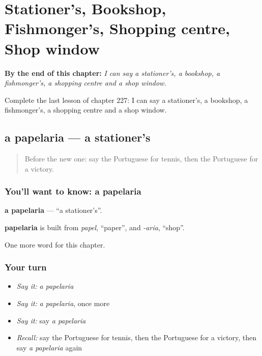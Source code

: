 
\chapter{Stationer's, Bookshop, Fishmonger's, Shopping centre, Shop window}
\label{ch:pt-stationer-s-bookshop-fishmonger-s-shopping-centre-shop-window}

\begin{chapteropening}
\textbf{By the end of this chapter:} \emph{I can say a stationer's, a bookshop, a fishmonger's, a shopping centre and a shop window.}

Complete the last lesson of chapter 227: I can say a stationer's, a bookshop, a fishmonger's, a shopping centre and a shop window.
\end{chapteropening}

\section[a papelaria]{a papelaria — a stationer's}

\label{lesson:PT-C227-papelaria}



\begin{quote}
Before the new one: say the Portuguese for tennis, then the Portuguese for a victory.
\end{quote}

\subsection*{You'll want to know: a papelaria}
\textbf{a papelaria} — \textquotedblleft{}a stationer's\textquotedblright{}.

\begin{cousinweb}
\textbf{papelaria} is built from \emph{papel}, \textquotedblleft{}paper\textquotedblright{}, and \emph{-aria}, \textquotedblleft{}shop\textquotedblright{}.
\end{cousinweb}

\begin{grammarlens}[title={What you've built}]
One more word for this chapter.
\end{grammarlens}

\subsection*{Your turn}
\begin{itemize}
\raggedright
  \item \emph{Say it:} \emph{a papelaria}
  \item \emph{Say it:} \emph{a papelaria}, once more
  \item \emph{Say it:} say \emph{a papelaria}
  \item \emph{Recall:} say the Portuguese for tennis, then the Portuguese for a victory, then say \emph{a papelaria} again
\end{itemize}

